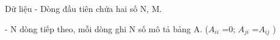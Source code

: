 Dữ liệu
- Dòng đầu tiên chứa hai số N, M.   


   - N dòng tiếp theo, mỗi dòng ghi N số mô tả bảng A. ($A_{ii}$   =0; $A_{ji}$   =$A_{ij}$   )